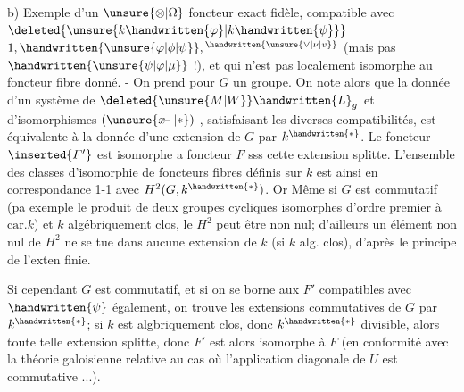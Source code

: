 
b) Exemple d'un $\unsure{\otimes|\Omega}$ foncteur exact fidèle, compatible avec $\deleted{\unsure{k\handwritten{\varphi}|k\handwritten{\psi}}}$ $1,\handwritten{\unsure{\varphi|\phi|\psi}},{}^{\handwritten{\unsure{\vee|\nu|v}}}$ (mais pas  $\handwritten{\unsure{\psi|\varphi|\mu}}$ !), et qui n'est pas localement isomorphe au foncteur fibre donné. - On prend pour $G$ un groupe. On note alors que la donnée d'un système de $\deleted{\unsure{M|W}}\handwritten{L}_{g}$ et d'isomorphismes $(\unsure{\rlap{\(x\)}-|*})$ , satisfaisant les diverses compatibilités, est équivalente à la donnée d'une extension de $G$ par $k^{\handwritten{*}}$. Le foncteur $\inserted{F'}$ est isomorphe a foncteur $F$ sss cette extension splitte. L'ensemble des classes d'isomorphie de foncteurs fibres définis sur $k$ est ainsi en correspondance 1-1 avec $H^{2}(G,k^{\handwritten{*}})$. Or Même si $G$ est commutatif (pa exemple le produit de deux groupes cycliques isomorphes d'ordre premier à  $\mathrm{car}.k$) et $k$ algébriquement clos, le $H^{2}$ peut être non nul;  d'ailleurs un élément non nul de $H^{2}$ ne se tue dans aucune extension de $k$ (si $k$ alg. clos), d'après le principe de l'exten finie.

Si cependant $G$ est commutatif, et si on se borne aux $F'$ compatibles avec $\handwritten{\psi}$ également, on trouve les extensions commutatives de $G$ par $k^{\handwritten{*}}$; si $k$ est algbriquement clos, donc $k^{\handwritten{*}}$ divisible, alors toute telle extension splitte, donc $F'$ est alors isomorphe à $F$ (en conformité avec la théorie galoisienne relative au cas où l'application diagonale de $U$ est commutative ...).

